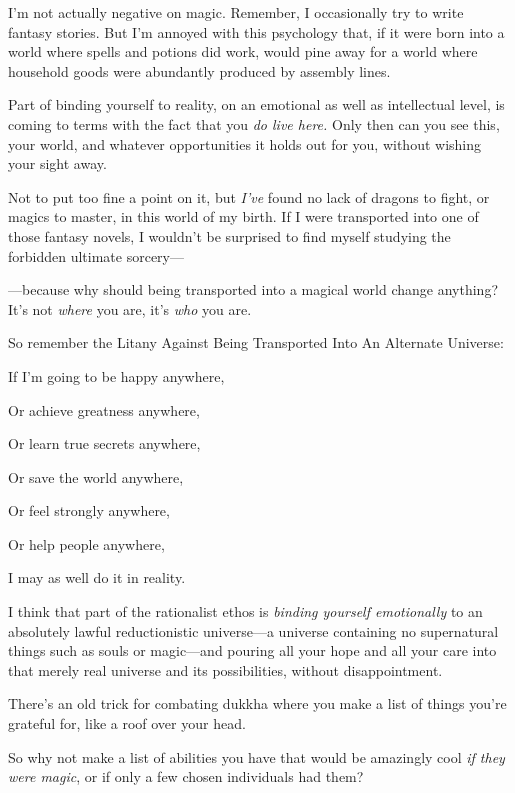 {
 I'm not actually negative on magic. Remember, I
occasionally try to write fantasy stories. But I'm
annoyed with this psychology that, if it were born into a world where
spells and potions did work, would pine away for a world where
household goods were abundantly produced by assembly lines.}

{
 Part of binding yourself to reality, on an emotional as well as
intellectual level, is coming to terms with the fact that you
\textit{do live here.} Only then can you see this, your world, and
whatever opportunities it holds out for you, without wishing your sight
away.}

{
 Not to put too fine a point on it, but
\textit{I've} found no lack of dragons to fight, or
magics to master, in this world of my birth. If I were transported into
one of those fantasy novels, I wouldn't be surprised to
find myself studying the forbidden ultimate sorcery---}

{
 {}---because why should being transported into a magical world
change anything? It's not \textit{where} you are,
it's \textit{who} you are.}

{
 So remember the Litany Against Being Transported Into An Alternate
Universe:\newline
}

{
 If I'm going to be happy anywhere,}

{
 Or achieve greatness anywhere,}

{
 Or learn true secrets anywhere,}

{
 Or save the world anywhere,}

{
 Or feel strongly anywhere,}

{
 Or help people anywhere,}

{
 I may as well do it in reality.}

\myendsectiontext


\bigskip


{
 I think that part of the rationalist ethos is \textit{binding
yourself emotionally} to an absolutely lawful reductionistic
universe---a universe containing no supernatural things such as souls
or magic---and pouring all your hope and all your care into that merely
real universe and its possibilities, without disappointment. }

{
 There's an old trick for combating dukkha where
you make a list of things you're grateful for, like a
roof over your head.}

{
 So why not make a list of abilities you have that would be
amazingly cool \textit{if they were magic}, or if only a few chosen
individuals had them?}

